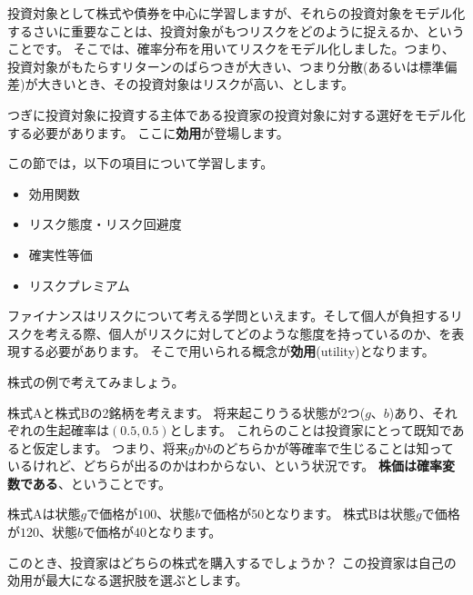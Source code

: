 \documentclass[
  letterpaper,
  pandoc,
  ja=standard,
  jafont = hiragino-pron]{ltjsbook}
\providecommand{\tightlist}{%
  \setlength{\itemsep}{0pt}\setlength{\parskip}{0pt}}\usepackage{longtable,booktabs,array}
\begin{document}
投資対象として株式や債券を中心に学習しますが、それらの投資対象をモデル化するさいに重要なことは、投資対象がもつリスクをどのように捉えるか、ということです。
そこでは、確率分布を用いてリスクをモデル化しました。つまり、投資対象がもたらすリターンのばらつきが大きい、つまり分散(あるいは標準偏差)が大きいとき、その投資対象はリスクが高い、とします。

つぎに投資対象に投資する主体である投資家の投資対象に対する選好をモデル化する必要があります。
ここに\textbf{効用}が登場します。

この節では，以下の項目について学習します。

\begin{itemize}
\tightlist
\item
  効用関数
\item
  リスク態度・リスク回避度
\item
  確実性等価
\item
  リスクプレミアム
\end{itemize}

ファイナンスはリスクについて考える学問といえます。そして個人が負担するリスクを考える際、個人がリスクに対してどのような態度を持っているのか、を表現する必要があります。
そこで用いられる概念が\textbf{効用}(utility)となります。

株式の例で考えてみましょう。

\begin{tcolorbox}[enhanced jigsaw, colframe=quarto-callout-warning-color-frame, breakable, rightrule=.15mm, coltitle=black, title=\textcolor{quarto-callout-warning-color}{\faExclamationTriangle}\hspace{0.5em}{例1 : 株価}, colbacktitle=quarto-callout-warning-color!10!white, leftrule=.75mm, colback=white, left=2mm, arc=.35mm, opacityback=0, titlerule=0mm, toptitle=1mm, bottomtitle=1mm, bottomrule=.15mm, toprule=.15mm, opacitybacktitle=0.6]

株式Aと株式Bの2銘柄を考えます。
将来起こりうる状態が2つ(\(g\)、\(b\))あり、それぞれの生起確率は\((0.5, 0.5)\)とします。
これらのことは投資家にとって既知であると仮定します。
つまり、将来\(g\)か\(b\)のどちらかが等確率で生じることは知っているけれど、どちらが出るのかはわからない、という状況です。
\textbf{株価は確率変数である}、ということです。

株式Aは状態\(g\)で価格が\(100\)、状態\(b\)で価格が\(50\)となります。
株式Bは状態\(g\)で価格が\(120\)、状態\(b\)で価格が\(40\)となります。

このとき、投資家はどちらの株式を購入するでしょうか？
この投資家は自己の効用が最大になる選択肢を選ぶとします。

\end{tcolorbox}
\end{document}
